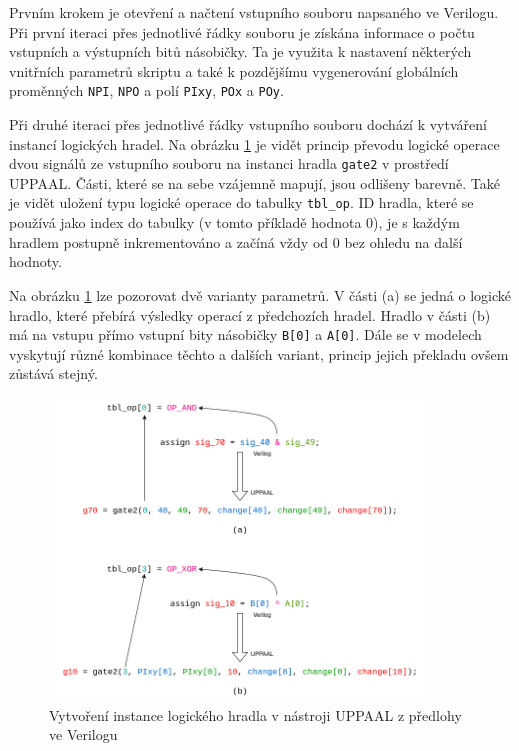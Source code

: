 Prvním krokem je otevření a načtení vstupního souboru napsaného ve Verilogu. Při první iteraci přes jednotlivé řádky souboru je získána informace o počtu vstupních a výstupních bitů násobičky. Ta je využita k nastavení některých vnitřních parametrů skriptu a také k pozdějšímu vygenerování globálních proměnných \texttt{NPI}, \texttt{NPO} a polí \texttt{PIxy}, \texttt{POx} a \texttt{POy}.

Při druhé iteraci přes jednotlivé řádky vstupního souboru dochází k vytváření instancí logických hradel. Na obrázku \ref{fig:sig_to_gate} je vidět princip převodu logické operace dvou signálů ze vstupního souboru na instanci hradla \texttt{gate2} v prostředí UPPAAL. Části, které se na sebe vzájemně mapují, jsou odlišeny barevně. Také je vidět uložení typu logické operace do tabulky \texttt{tbl\_op}. ID hradla, které se používá jako index do tabulky (v tomto příkladě hodnota 0), je s každým hradlem postupně inkrementováno a začíná vždy od 0 bez ohledu na další hodnoty.

Na obrázku \ref{fig:sig_to_gate} lze pozorovat dvě varianty parametrů. V části (a) se jedná o logické hradlo, které přebírá výsledky operací z předchozích hradel. Hradlo v části (b) má na vstupu přímo vstupní bity násobičky \texttt{B[0]} a \texttt{A[0]}. Dále se v modelech vyskytují různé kombinace těchto a dalších variant, princip jejich překladu ovšem zůstává stejný.

\begin{figure}[H]
    \centering
    \includegraphics[width=0.9\textwidth]{obrazky-figures/sig_to_gate.png}
    \caption{Vytvoření instance logického hradla v nástroji UPPAAL z předlohy ve Verilogu}
    \label{fig:sig_to_gate}
\end{figure}

